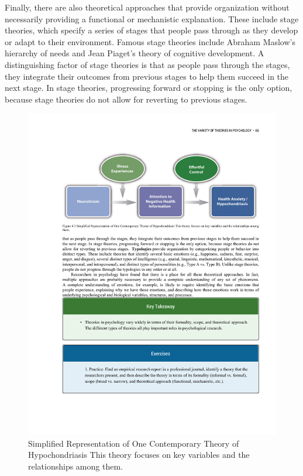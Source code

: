Finally, there are also theoretical approaches that provide organization without necessarily providing a functional or mechanistic explanation. These include stage theories, which specify a series of stages that people pass through as they develop or adapt to their environment. Famous stage theories include Abraham Maslow's hierarchy of needs and Jean Piaget's theory of cognitive development. A distinguishing factor of stage theories is that as people pass through the stages, they integrate their outcomes from previous stages to help them succeed in the next stage. In stage theories, progressing forward or stopping is the only option, because stage theories do not allow for reverting to previous stages. 


\begin{figure}
      \includegraphics[width=\linewidth]{figures/C4Hypo.pdf}
      \caption{Simplified Representation of One Contemporary Theory of Hypochondriasis This theory focuses on key variables and the relationships among them.
}
      \label{fig:Hypo}
\end{figure}

